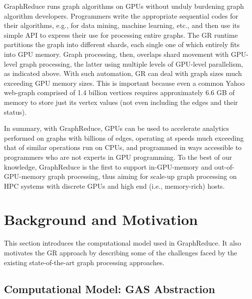 GraphReduce runs graph algorithms on GPUs without unduly burdening graph algorithm developers. 
Programmers write the appropriate sequential codes for their algorithms, e.g., for data mining, machine learning, etc.,
and then use its simple API to express their use for processing entire graphs. The GR runtime partitions the
graph into different shards, each single one of which entirely fits into GPU memory. Graph processing, then, 
overlaps shard movement with GPU-level graph processing, the latter using multiple levels of GPU-level parallelism,
as indicated above. With such automation, GR can deal with graph sizes much exceeding GPU memory sizes. This is
important because even a common Yahoo web-graph comprised of 1.4 billion vertices \cite{yahoo} requires approximately 
6.6 GB of memory to store just its vertex values (not even including the edges and their status). 

In summary, with GraphReduce, GPUs can be used to accelerate analytics performed on graphs with billions of edges, 
operating at speeds much exceeding that of similar operations run on CPUs, and programmed in ways accessible 
to programmers who are not experts in GPU programming. To the best of our knowledge, GraphReduce is the first
to support in-GPU-memory and out-of-GPU-memory graph processing, thus aiming for scale-up graph processing 
on HPC systems with discrete GPUs and high end (i.e., memory-rich) hosts.

\section{Background and Motivation}
\label{bg}

This section introduces the computational model used in GraphReduce. It also motivates the GR approach by describing some of
the challenges faced by the existing state-of-the-art graph processing approaches.


\subsection{Computational Model: GAS Abstraction}



